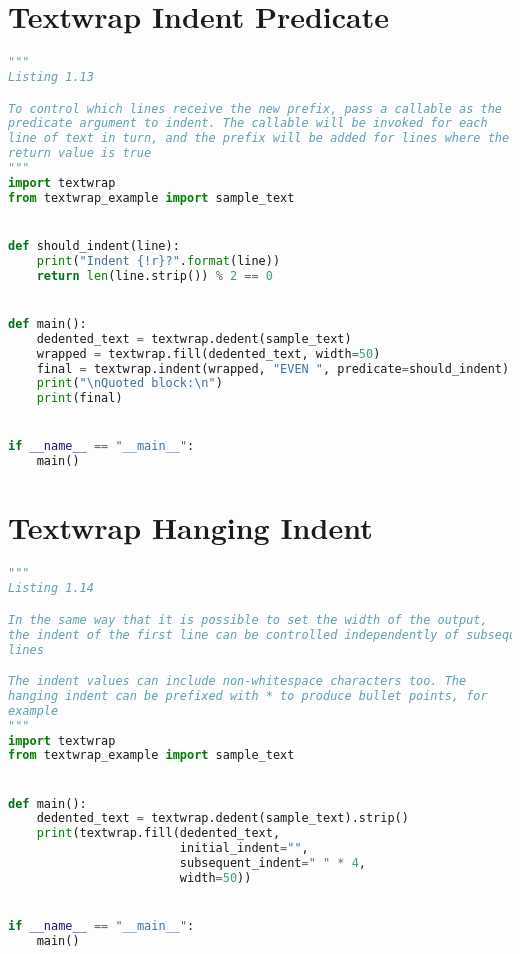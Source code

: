 \documentclass[a4paper,landscape]{report}
\begin{document}
\section{Textwrap Indent Predicate}
\begin{lstlisting}[language=Python]
"""
Listing 1.13

To control which lines receive the new prefix, pass a callable as the
predicate argument to indent. The callable will be invoked for each
line of text in turn, and the prefix will be added for lines where the
return value is true
"""
import textwrap
from textwrap_example import sample_text


def should_indent(line):
    print("Indent {!r}?".format(line))
    return len(line.strip()) % 2 == 0


def main():
    dedented_text = textwrap.dedent(sample_text)
    wrapped = textwrap.fill(dedented_text, width=50)
    final = textwrap.indent(wrapped, "EVEN ", predicate=should_indent)
    print("\nQuoted block:\n")
    print(final)


if __name__ == "__main__":
    main()

\end{lstlisting}
\section{Textwrap Hanging Indent}
\begin{lstlisting}[language=Python]
"""
Listing 1.14

In the same way that it is possible to set the width of the output,
the indent of the first line can be controlled independently of subsequent
lines

The indent values can include non-whitespace characters too. The
hanging indent can be prefixed with * to produce bullet points, for
example
"""
import textwrap
from textwrap_example import sample_text


def main():
    dedented_text = textwrap.dedent(sample_text).strip()
    print(textwrap.fill(dedented_text,
                        initial_indent="",
                        subsequent_indent=" " * 4,
                        width=50))


if __name__ == "__main__":
    main()

\end{lstlisting}
\end{document}
